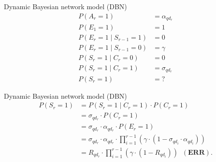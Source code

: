 \vspace{0.25cm}
\begin{minipage}{0.5\textwidth}
Dynamic Bayesian network model (DBN) 
\begin{align*}
P\left(A_{r}=1\right) &=\alpha_{q d_{r}} \\
P\left(E_{1}=1\right) &=1 \\
P\left(E_{r}=1 \mid S_{r-1}=1\right) &=0 \\
P\left(E_{r}=1 \mid S_{r-1}=0\right) &=\gamma \\
P\left(S_{r}=1 \mid C_{r}=0\right) &=0 \\
P\left(S_{r}=1 \mid C_{r}=1\right) &=\sigma_{q d_{r}} \\
P\left(S_{r}=1\right) &=? 
\end{align*} 
\end{minipage}
\begin{minipage}{0.5\textwidth}
Dynamic Bayesian network model (DBN) 
\begin{align*}
P\left(S_{r}=1\right) &=P\left(S_{r}=1 \mid C_{r}=1\right) \cdot P\left(C_{r}=1\right) \\
&=\sigma_{q d_{r}} \cdot P\left(C_{r}=1\right) \\
&=\sigma_{q d_{r}} \cdot \alpha_{q d_{r}} \cdot P\left(E_{r}=1\right) \\
&=\sigma_{q d_{r}} \cdot \alpha_{q d_{r}} \cdot \prod_{i=1}^{r-1}\left(\gamma \cdot\left(1-\sigma_{q d_{i}} \cdot \alpha_{q d_{i}}\right)\right) \\
&=R_{q d_{r}} \cdot \prod_{i=1}^{r-1}\left(\gamma \cdot\left(1-R_{q d_{i}}\right)\right) \;\;(\textbf{ERR}).
\end{align*}
\end{minipage}

\newpage